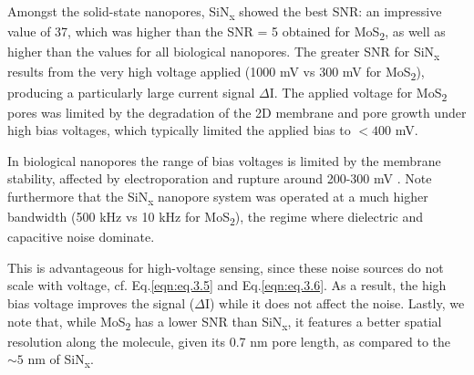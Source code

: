 Amongst the solid-state nanopores, SiN\textsubscript{x} showed the best SNR: an impressive value of 37, which was higher than the SNR = 5 obtained for MoS\textsubscript{2}, as well as higher than the values for all biological nanopores. The greater SNR for SiN\textsubscript{x} results from the very high voltage applied (1000 mV vs 300 mV for MoS\textsubscript{2}), producing a particularly large current signal $\Delta$I. The applied voltage for MoS\textsubscript{2} pores was limited by the degradation of the 2D membrane and pore growth under high bias voltages, which typically limited the applied bias to $<400$ mV. 

In biological nanopores the range of bias voltages is limited by the membrane stability, affected by electroporation and rupture around 200-300 mV \cite{Pavlin2008,Tarek2005}. Note furthermore that the SiN\textsubscript{x} nanopore system was operated at a much higher bandwidth (500 kHz vs 10 kHz for MoS\textsubscript{2}), the regime where dielectric and capacitive noise dominate. 

This is advantageous for high-voltage sensing, since these noise sources do not scale with voltage, cf. Eq.\ref{eqn:eq.3.5} and Eq.\ref{eqn:eq.3.6}. As a result, the high bias voltage improves the signal ($\Delta$I) while it does not affect the noise. Lastly, we note that, while MoS\textsubscript{2} has a lower SNR than SiN\textsubscript{x}, it features a better spatial resolution along the molecule, given its 0.7 nm pore length, as compared to the $\sim5$ nm of SiN\textsubscript{x}. 


